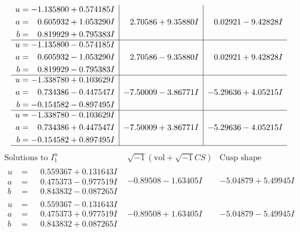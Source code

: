 \documentclass[1p]{elsarticle_modified}
\theoremstyle{definition}
\newcommand{\I}{\sqrt{-1}}
\begin{document}
$$\begin{array}{c|c|c}
\begin{aligned}
u &= -1.135800 + 0.574185 I \\
a &= \phantom{-}0.605932 + 1.053290 I \\
b &= \phantom{-}0.819929 + 0.795383 I\end{aligned}
 & \phantom{-}2.70586 + 9.35880 I & \phantom{-}0.02921 - 9.42828 I \\ \hline\begin{aligned}
u &= -1.135800 - 0.574185 I \\
a &= \phantom{-}0.605932 - 1.053290 I \\
b &= \phantom{-}0.819929 - 0.795383 I\end{aligned}
 & \phantom{-}2.70586 - 9.35880 I & \phantom{-}0.02921 + 9.42828 I \\ \hline\begin{aligned}
u &= -1.338780 + 0.103629 I \\
a &= \phantom{-}0.734386 - 0.447547 I \\
b &= -0.154582 - 0.897495 I\end{aligned}
 & -7.50009 - 3.86771 I & -5.29636 + 4.05215 I \\ \hline\begin{aligned}
u &= -1.338780 - 0.103629 I \\
a &= \phantom{-}0.734386 + 0.447547 I \\
b &= -0.154582 + 0.897495 I\end{aligned}
 & -7.50009 + 3.86771 I & -5.29636 - 4.05215 I\\
 \hline 
 \end{array}$$\newpage$$\begin{array}{c|c|c}  
\text{Solutions to }I^u_{1}& \I (\text{vol} + \sqrt{-1}CS) & \text{Cusp shape}\\
 \hline 
\begin{aligned}
u &= \phantom{-}0.559367 + 0.131643 I \\
a &= \phantom{-}0.475373 - 0.977519 I \\
b &= \phantom{-}0.843832 - 0.087265 I\end{aligned}
 & -0.89508 - 1.63405 I & -5.04879 + 5.49945 I \\ \hline\begin{aligned}
u &= \phantom{-}0.559367 - 0.131643 I \\
a &= \phantom{-}0.475373 + 0.977519 I \\
b &= \phantom{-}0.843832 + 0.087265 I\end{aligned}
 & -0.89508 + 1.63405 I & -5.04879 - 5.49945 I \\ \hline\begin{aligned}

\end{aligned}
\end{array}$$
\end{document}
